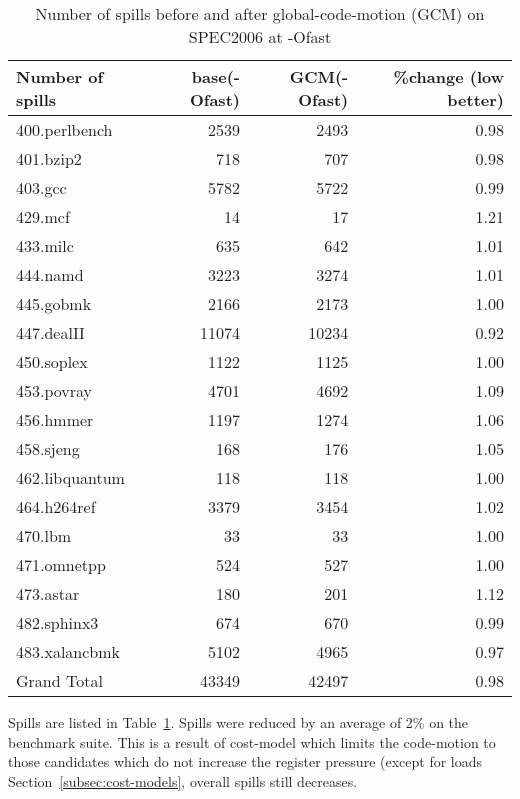 \documentclass[acmlarge,review,anonymous]{acmart}\settopmatter{printfolios=true}
\begin{document}
\begin{table}[h!]
  \begin{center}
    \begin{tabular}{|l|r|r|r|}
      \hline
Number of spills  &base(-Ofast) &GCM(-Ofast) &\%change (low better) \\\hline
400.perlbench	  & 2539	& 2493	& 0.98 \\\hline
401.bzip2	  & 718	        & 707	& 0.98 \\\hline
403.gcc	          & 5782	& 5722	& 0.99 \\\hline
429.mcf	          & 14	        & 17	& 1.21 \\\hline
433.milc	  & 635	        & 642	& 1.01 \\\hline
444.namd	  & 3223	& 3274	& 1.01 \\\hline
445.gobmk	  & 2166	& 2173	& 1.00 \\\hline
447.dealII	  & 11074	& 10234	& 0.92 \\\hline
450.soplex	  & 1122	& 1125	& 1.00 \\\hline
453.povray	  & 4701	& 4692	& 1.09 \\\hline
456.hmmer	  & 1197	& 1274	& 1.06 \\\hline
458.sjeng	  & 168	        & 176	& 1.05 \\\hline
462.libquantum	  & 118	        & 118	& 1.00 \\\hline
464.h264ref	  & 3379	& 3454	& 1.02 \\\hline
470.lbm	          & 33	        & 33	& 1.00 \\\hline
471.omnetpp	  & 524	        & 527	& 1.00 \\\hline
473.astar	  & 180	        & 201	& 1.12 \\\hline
482.sphinx3	  & 674	        & 670	& 0.99 \\\hline
483.xalancbmk	  & 5102	& 4965	& 0.97 \\\hline
Grand Total	  & 43349	& 42497	& 0.98 \\\hline
    \end{tabular}
  \end{center}
  \caption{Number of spills before and after global-code-motion (GCM) on SPEC2006 at -Ofast}
  \label{tab:spills}
\end{table}

Spills are listed in Table~\ref{tab:spills}. Spills were reduced by an average
of 2\% on the \SPEC{} benchmark suite. This is a result of cost-model which
limits the code-motion to those candidates which do not increase the register
pressure (except for loads Section~\ref{subsec:cost-models}, overall spills
still decreases.
\end{document}
